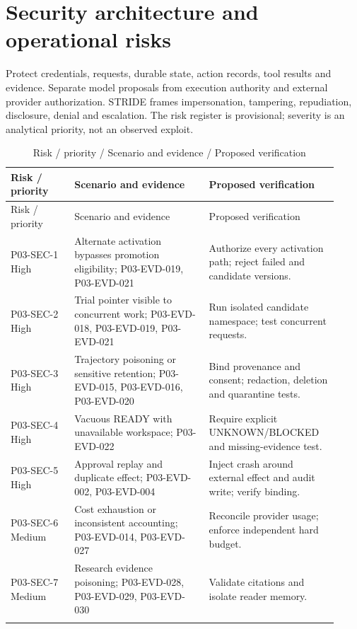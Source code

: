 \documentclass[10pt,letterpaper]{article}
\begin{document}
\section{Security architecture and operational risks}
Protect credentials, requests, durable state, action records, tool results and evidence. Separate model proposals from execution authority and external provider authorization. STRIDE frames impersonation, tampering, repudiation, disclosure, denial and escalation. The risk register is provisional; severity is an analytical priority, not an observed exploit.
\begin{longtable}{@{}>{\raggedright\arraybackslash}p{0.18\linewidth}>{\raggedright\arraybackslash}p{0.38\linewidth}>{\raggedright\arraybackslash}p{0.36\linewidth}@{}}
\caption{Risk / priority / Scenario and evidence / Proposed verification}\\
\toprule Risk / priority & Scenario and evidence & Proposed verification\\\midrule\endfirsthead
\toprule Risk / priority & Scenario and evidence & Proposed verification\\\midrule\endhead
P03-SEC-1 High & Alternate activation bypasses promotion eligibility; P03-EVD-019, P03-EVD-021 & Authorize every activation path; reject failed and candidate versions.\\\addlinespace
P03-SEC-2 High & Trial pointer visible to concurrent work; P03-EVD-018, P03-EVD-019, P03-EVD-021 & Run isolated candidate namespace; test concurrent requests.\\\addlinespace
P03-SEC-3 High & Trajectory poisoning or sensitive retention; P03-EVD-015, P03-EVD-016, P03-EVD-020 & Bind provenance and consent; redaction, deletion and quarantine tests.\\\addlinespace
P03-SEC-4 High & Vacuous READY with unavailable workspace; P03-EVD-022 & Require explicit UNKNOWN/BLOCKED and missing-evidence test.\\\addlinespace
P03-SEC-5 High & Approval replay and duplicate effect; P03-EVD-002, P03-EVD-004 & Inject crash around external effect and audit write; verify binding.\\\addlinespace
P03-SEC-6 Medium & Cost exhaustion or inconsistent accounting; P03-EVD-014, P03-EVD-027 & Reconcile provider usage; enforce independent hard budget.\\\addlinespace
P03-SEC-7 Medium & Research evidence poisoning; P03-EVD-028, P03-EVD-029, P03-EVD-030 & Validate citations and isolate reader memory.\\\addlinespace
\bottomrule\end{longtable}
\end{document}
